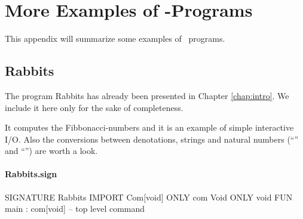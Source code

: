 
\chapter{More Examples of \opal-Programs}
This appendix will summarize some examples of \opal\ programs.

\section{Rabbits}
\label{prog:rabbits}
The program Rabbits has already been presented in Chapter \ref{chap:intro}.
We include it here only for the sake of completeness.

It computes the Fibbonacci-numbers and it is an example of simple
interactive I/O. Also the conversions between denotations, strings and
natural numbers (``'' and ``\pro{!}'') are worth a  look.

\subsubsection{Rabbits.sign}
\begin{prog}
  SIGNATURE Rabbits
  IMPORT  Com[void]       ONLY com
          Void            ONLY void
  FUN main : com[void]  -- top level command
\end{prog}

